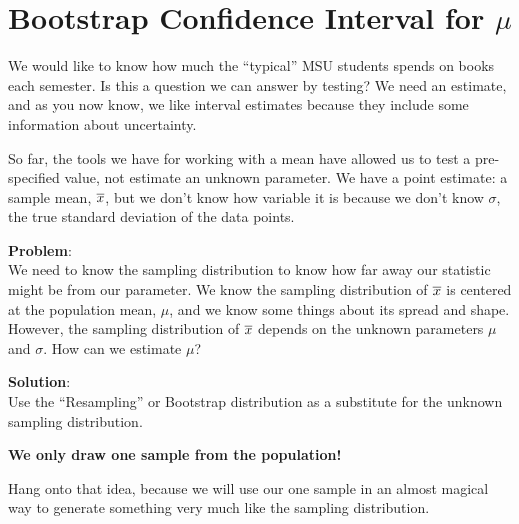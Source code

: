 \def\theTopic{Textbook Costs}
\def\dayNum{11 }


\section{Bootstrap  Confidence Interval for $\mu$}


We would like to know how much the ``typical'' MSU students spends on
books each semester.  Is this a question we can answer by testing?
  We need an estimate, and as you now know, we like interval
estimates because they include some information about uncertainty.

So far, the tools we have for working with a mean have allowed us to
test a pre-specified value, not estimate an unknown parameter.
We have a point estimate: a sample mean, $\overline{x}$, but we don't know how
variable it is because we don't know $\sigma$, the true standard
deviation of the data points. 

{\bf Problem}:\\
We need to know the sampling distribution to know how far away our
statistic might be from our parameter.  We know the sampling
distribution of $ \overline{x}$ is centered at the population mean, $\mu$, and
we know some things about its spread and shape.   However, the sampling
distribution  of $\overline{x}$ depends on the unknown parameters $\mu$ and $\sigma$. How
can we estimate $\mu$?  


{\bf Solution}:\\Use the ``Resampling'' or Bootstrap distribution as a
substitute for the unknown sampling distribution.
\vspace{-.2in}
\begin{center}
	{\bf\sf	We only draw {\bf one} sample from the population!}
\end{center}

Hang onto that idea, because we will use our one sample  in an almost
magical way to generate something very much like the sampling
distribution.   


